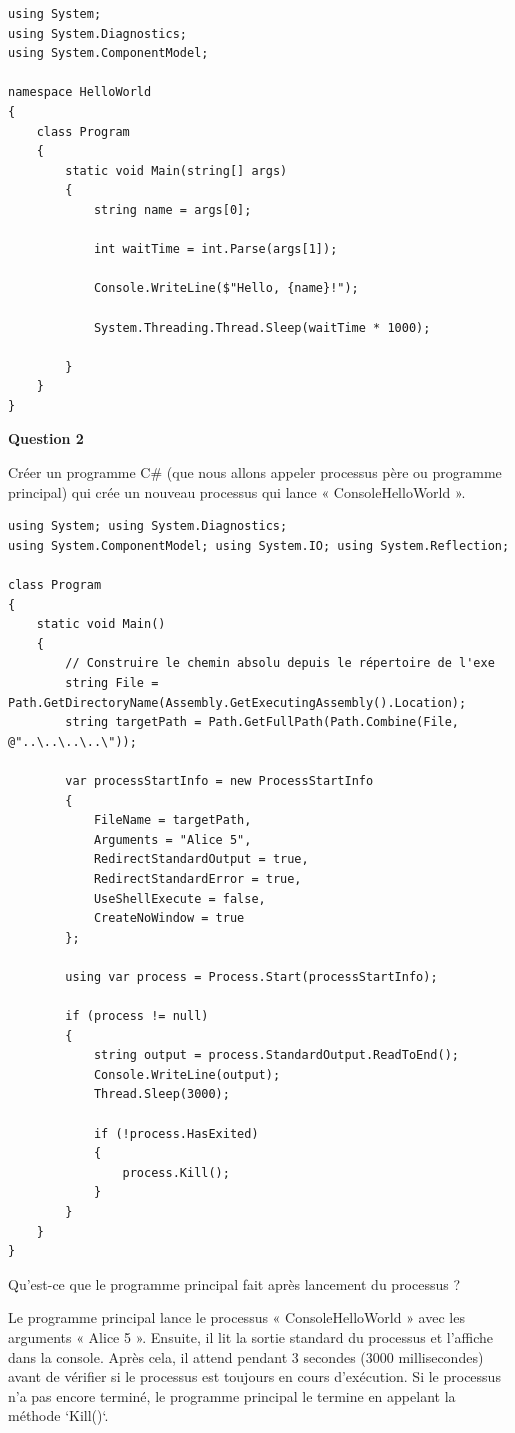 \vspace{0.5cm}

\begin{verbatim}
using System;
using System.Diagnostics;
using System.ComponentModel;

namespace HelloWorld
{
    class Program
    {
        static void Main(string[] args)
        {
            string name = args[0];

            int waitTime = int.Parse(args[1]);

            Console.WriteLine($"Hello, {name}!");

            System.Threading.Thread.Sleep(waitTime * 1000);

        }
    }
}
\end{verbatim}

\newpage

\noindent \textbf{Question 2}

\noindent Créer un programme C\# (que nous allons appeler processus père ou programme principal) qui crée un nouveau processus qui lance « ConsoleHelloWorld ».

\begin{verbatim}
using System; using System.Diagnostics;
using System.ComponentModel; using System.IO; using System.Reflection;

class Program
{
	static void Main()
	{
		// Construire le chemin absolu depuis le répertoire de l'exe
		string File = Path.GetDirectoryName(Assembly.GetExecutingAssembly().Location);
		string targetPath = Path.GetFullPath(Path.Combine(File, @"..\..\..\..\"));

		var processStartInfo = new ProcessStartInfo
		{
			FileName = targetPath,
			Arguments = "Alice 5",
			RedirectStandardOutput = true,
			RedirectStandardError = true,
			UseShellExecute = false,
			CreateNoWindow = true
		};

		using var process = Process.Start(processStartInfo);

		if (process != null)
		{
			string output = process.StandardOutput.ReadToEnd();
			Console.WriteLine(output);
			Thread.Sleep(3000);

			if (!process.HasExited)
			{
				process.Kill();
			}
		}
	}
}
\end{verbatim}

\noindent Qu'est-ce que le programme principal fait après lancement du processus ? \\

\begin{captionbox}
Le programme principal lance le processus « ConsoleHelloWorld » avec les arguments « Alice 5 ». Ensuite, il lit la sortie standard du processus et l'affiche dans la console. Après cela, il attend pendant 3 secondes (3000 millisecondes) avant de vérifier si le processus est toujours en cours d'exécution. Si le processus n'a pas encore terminé, le programme principal le termine en appelant la méthode `Kill()`.
\end{captionbox}


